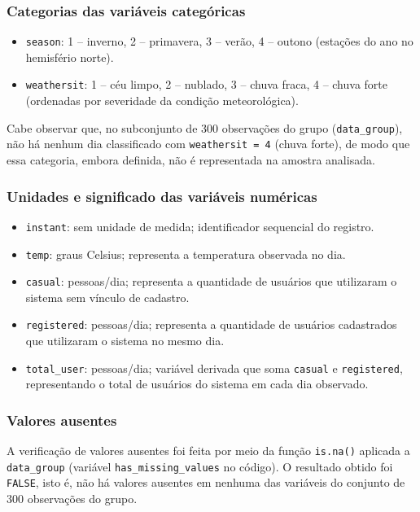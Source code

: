 \documentclass[10pt, a4paper]{article}
\begin{document}
\subsubsection{Categorias das variáveis categóricas}

\begin{itemize}
    \item \texttt{season}: 1 -- inverno, 2 -- primavera, 3 -- verão, 4 -- outono (estações do ano no hemisfério norte).
    \item \texttt{weathersit}: 1 -- céu limpo, 2 -- nublado, 3 -- chuva fraca, 4 -- chuva forte (ordenadas por severidade da condição meteorológica).
\end{itemize}

Cabe observar que, no subconjunto de 300 observações do grupo (\texttt{data\_group}), não há nenhum dia classificado com \texttt{weathersit = 4} (chuva forte), de modo que essa categoria, embora definida, não é representada na amostra analisada.

\subsubsection{Unidades e significado das variáveis numéricas}

\begin{itemize}
    \item \texttt{instant}: sem unidade de medida; identificador sequencial do registro.
    \item \texttt{temp}: graus Celsius; representa a temperatura observada no dia.
    \item \texttt{casual}: pessoas/dia; representa a quantidade de usuários que utilizaram o sistema sem vínculo de cadastro.
    \item \texttt{registered}: pessoas/dia; representa a quantidade de usuários cadastrados que utilizaram o sistema no mesmo dia.
    \item \texttt{total\_user}: pessoas/dia; variável derivada que soma \texttt{casual} e \texttt{registered}, representando o total de usuários do sistema em cada dia observado.
\end{itemize}

\subsubsection{Valores ausentes}
A verificação de valores ausentes foi feita por meio da função \texttt{is.na()} aplicada a \texttt{data\_group} (variável \texttt{has\_missing\_values} no código). O resultado obtido foi \texttt{FALSE}, isto é, não há valores ausentes em nenhuma das variáveis do conjunto de 300 observações do grupo.
\end{document}
